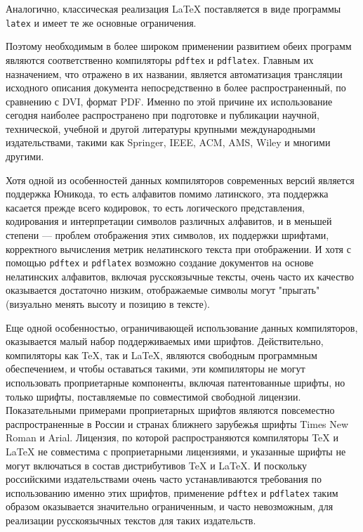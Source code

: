 \documentclass[workbook, draught]{fefudoc}
\begin{document}
Аналогично, классическая реализация \LaTeX{} поставляется в виде программы \texttt{latex} и имеет те же основные ограничения.

Поэтому необходимым в более широком применении развитием обеих программ являются соответственно компиляторы \texttt{pdftex} и \texttt{pdflatex}.
Главным их назначением, что отражено в их названии, является автоматизация трансляции исходного описания документа непосредственно в более распространенный, по сравнению с DVI, формат PDF.
Именно по этой причине их использование сегодня наиболее распространено при подготовке и публикации научной, технической, учебной и другой литературы крупными международными издательствами, такими как Springer, IEEE, ACM, AMS, Wiley и многими другими.

Хотя одной из особенностей данных компиляторов современных версий является поддержка Юникода, то есть алфавитов помимо латинского, эта поддержка касается прежде всего кодировок, то есть логического представления, кодирования и интерпретации символов различных алфавитов, и в меньшей степени --- проблем отображения этих символов, их поддержки шрифтами, корректного вычисления метрик нелатинского текста при отображении.
И хотя с помощью \texttt{pdftex} и \texttt{pdflatex} возможно создание документов на основе нелатинских алфавитов, включая русскоязычные тексты, очень часто их качество оказывается достаточно низким, отображаемые символы могут "прыгать" (визуально менять высоту и позицию в тексте).

Еще одной особенностью, ограничивающей использование данных компиляторов, оказывается малый набор поддерживаемых ими шрифтов.
Действительно, компиляторы как \TeX{}, так и \LaTeX{}, являются свободным программным обеспечением, и чтобы оставаться такими, эти компиляторы не могут использовать проприетарные компоненты, включая патентованные шрифты, но только шрифты, поставляемые по совместимой свободной лицензии.
Показательными примерами проприетарных шрифтов являются повсеместно распространенные в России и странах ближнего зарубежья шрифты Times New Roman и Arial.
Лицензия, по которой распространяются компиляторы \TeX{} и \LaTeX{} не совместима с проприетарными лицензиями, и указанные шрифты не могут включаться в состав дистрибутивов \TeX{} и \LaTeX{}.
И поскольку российскими издательствами очень часто устанавливаются требования по использованию именно этих шрифтов, применение \texttt{pdftex} и \texttt{pdflatex} таким образом оказывается значительно ограниченным, и часто невозможным, для реализации русскоязычных текстов для таких издательств.
\end{document}

